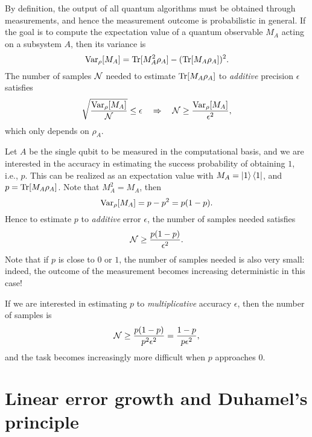 By definition, the output of all quantum algorithms must be obtained through measurements, and hence the measurement outcome is probabilistic in general.
If the goal is to compute the expectation value of a quantum observable $M_A$ acting on a subsystem $A$, then its variance is
\begin{equation}
\operatorname{Var}_{\rho}[M_A]=\operatorname{Tr}[M_A^2 \rho_A] - (\operatorname{Tr}[M_A \rho_A])^2.
\end{equation}
The number of samples $\mathcal{N}$ needed to estimate $\operatorname{Tr}[M_A \rho_A]$ to \emph{additive} precision $\epsilon$ satisfies
\begin{equation}
\sqrt{\frac{\operatorname{Var}_{\rho}[M_A]}{\mathcal{N}}}\le \epsilon \quad\Rightarrow\quad \mathcal{N}\ge \frac{\operatorname{Var}_{\rho}[M_A]}{\epsilon^2},
\end{equation}
which only depends on $\rho_A$. 

\begin{exam}\label{exam:prob_onequbit}
Let $A$ be the single qubit to be measured in the computational basis, and we are interested in the accuracy in estimating the success probability of obtaining $1$, i.e., $p$. 
This can be realized as an expectation value with $M_A=\ket{1}\bra{1}$, and $p=\operatorname{Tr}[M_A \rho_A]$.
Note that $M_A^2=M_A$, then
\begin{equation}
 \operatorname{Var}_{\rho}[M_A] = p-p^2=p(1-p).
\end{equation}
Hence to estimate $p$ to \emph{additive} error $\epsilon$, the number of samples needed satisfies
\begin{equation}
\mathcal{N}\ge \frac{p(1-p)}{\epsilon^2}.
\end{equation}
Note that if $p$ is close to $0$ or $1$, the number of samples needed is also very small: 
indeed, the outcome of the measurement becomes increasing deterministic in this case!

If we are interested in estimating $p$ to \emph{multiplicative} accuracy $\epsilon$, then the number of samples is
\begin{equation}
\mathcal{N}\ge \frac{p(1-p)}{p^2\epsilon^2}=\frac{1-p}{p\epsilon^2},
\end{equation}
and the task becomes increasingly more difficult when $p$ approaches $0$. 
\end{exam}

\section{Linear error growth and Duhamel's principle}

